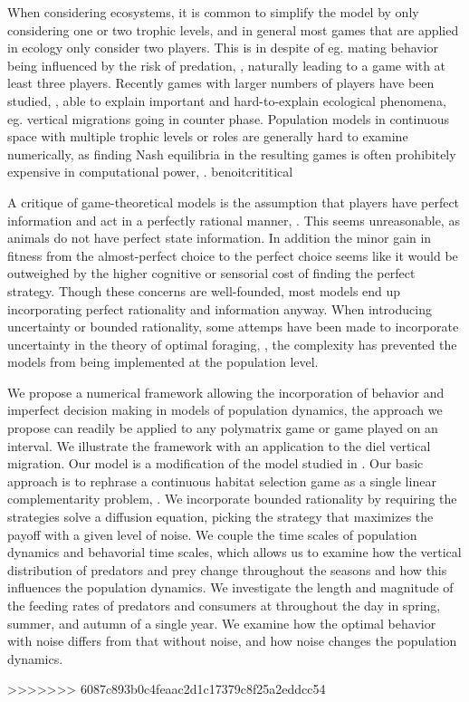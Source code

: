 When considering ecosystems, it is common to simplify the model by only considering one or two trophic levels, and in general most games that are applied in ecology only consider two players. This is in despite of eg. mating behavior being influenced by the risk of predation, \citep{carranza1999red,lima2009predators}, naturally leading to a game with at least three players. Recently games with larger numbers of players have been studied, \citep{pinti2019trophic}, able to explain important and hard-to-explain ecological phenomena, eg. vertical migrations going in counter phase. Population models in continuous space with multiple trophic levels or roles are generally hard to examine numerically, as finding Nash equilibria in the resulting games is often prohibitely expensive in computational power, \citep{empirical_trait,pinti2019trophic}.
benoitcrititical

A critique of game-theoretical models is the assumption that players have perfect information and act in a perfectly rational manner, \citep{jones1999bounded}. This seems unreasonable, as animals do not have perfect state information. In addition the minor gain in fitness from the almost-perfect choice to the perfect choice seems like it would be outweighed by the higher cognitive or sensorial cost of finding the perfect strategy. Though these concerns are well-founded, most models end up incorporating perfect rationality and information anyway. When introducing uncertainty or bounded rationality, some attemps have been made to incorporate uncertainty in the theory of optimal foraging, \citep{bayesianmodel, thuijsman1995automata,gigerenzer2001rethinking}, the complexity has prevented the models from being implemented at the population level.


We propose a numerical framework allowing the incorporation of behavior and imperfect decision making in models of population dynamics, the approach we propose can readily be applied to any polymatrix game or game played on an interval. We illustrate the framework with an application to the diel vertical migration. Our model is a modification of the model studied in \citep{verticalmigration}. Our basic approach is to rephrase a continuous habitat selection game as a single linear complementarity problem, \citep{miller1991copositive}. We incorporate bounded rationality by requiring the strategies solve a diffusion equation, picking the strategy that maximizes the payoff with a given level of noise.
We couple the time scales of population dynamics and behavorial time scales, which allows us to examine how the vertical distribution of predators and prey change throughout the seasons and how this influences the population dynamics. We investigate the length and magnitude of the feeding rates of predators and consumers at throughout the day in spring, summer, and autumn of a single year. We examine how the optimal behavior with noise differs from that without noise, and how noise changes the population dynamics.



>>>>>>> 6087c893b0c4feaac2d1c17379c8f25a2eddcc54





